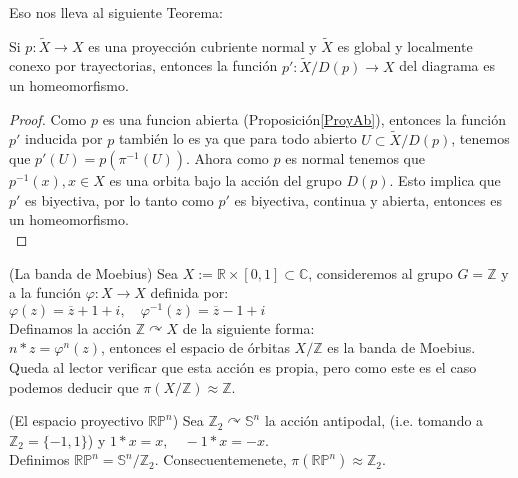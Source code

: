 Eso nos lleva al siguiente Teorema:\\

\begin{theorem}
Si $p:\widetilde{X} \rightarrow X$ es una proyecci\'on cubriente normal y $\widetilde{X}$ es global y localmente conexo por trayectorias, entonces la funci\'on $p':\widetilde{X}/D(p) \rightarrow X$ del diagrama es un homeomorfismo.\\ 
\end{theorem}

\begin{proof}
Como $p$ es una funcion abierta (Proposici\'on\ref{ProyAb}), entonces la funci\'on $p'$ inducida por $p$ tambi\'en lo es ya que para todo abierto $U \subset \widetilde{X}/D(p)$, tenemos que $p'(U)=p(\pi^{-1}(U))$. Ahora como $p$ es normal tenemos que $p^{-1}(x),x \in X$ es una orbita bajo la acci\'on del grupo $D(p)$. Esto implica que $p'$ es biyectiva, por lo tanto como $p'$ es biyectiva, continua y abierta, entonces es un homeomorfismo.\\ 
\end{proof}

\begin{example}\label{mobius}(La banda de Moebius)
Sea $X:= \mathbb{R} \times [0,1] \subset \mathbb{C}$, consideremos al grupo $G=\mathbb{Z}$ y a la funci\'on $\varphi:X \rightarrow X$ definida por:\\

$\varphi(z)=\overline{z}+1+i, \quad \varphi^{-1}(z)=\overline{z}-1+i$\\

Definamos la acci\'on $\mathbb{Z} \curvearrowright X$ de la siguiente forma:\\

$n*z= \varphi^{n}(z)$, entonces el espacio de \'orbitas $X / \mathbb{Z}$ es la banda de Moebius. Queda al lector verificar que esta acci\'on es propia, pero como este es el caso podemos deducir que $\pi(X/\mathbb{Z}) \approx \mathbb{Z}$.
\end{example}

\begin{example}(El espacio proyectivo $\mathbb{RP}^{n}$)
Sea $\mathbb Z_2 \curvearrowright \mathbb S^{n}$ la acci\'on antipodal, (i.e. tomando a $\mathbb Z_2=\lbrace -1,1 \rbrace$)   y $1*x=x, \quad -1*x=-x$.\\

Definimos $\mathbb{RP}^{n}= \mathbb S^{n}/\mathbb Z_2$. Consecuentemenete, $\pi(\mathbb{RP}^{n}) \approx \mathbb Z_2$. 
\end{example}


